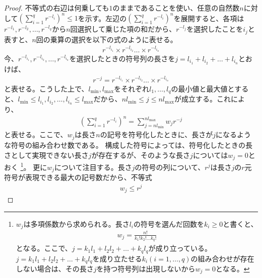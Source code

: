 \documentclass[uplatex,dvipdfmx,b5j,10pt]{jsbook}
\theoremstyle{definition}
\begin{document}
\begin{proof}
  不等式の右辺は何乗しても$1$のままであることを使い、任意の自然数$n$に対して$(\sum_{i=1}^{q} r^{-l_{i}})^{n} \leq 1$を示す。左辺の$(\sum_{i=1}^{q} r^{-l_{i}})^{n}$を展開すると、各項は$r^{-l_{1}}, r^{-l_{2}}, \dots, r^{-l_{q}}$から$n$回選択して乗じた項の和だから、$r^{-l_{j}}$を選択したことを$i_{j}$と表すと、$n$回の乗算の選択を以下の式のように表せる。
  \begin{eqnarray*}
    r^{-l_{i_{1}}} \times r^{-l_{i_{2}}} \dots \times r^{-l_{i_{n}}} 
  \end{eqnarray*}
  今、$r^{-l_{i_{1}}}, r^{-l_{i_{2}}}, \dots, r^{-l_{i_{n}}}$を選択したときの符号列の長さを$j = l_{i_{1}} + l_{i_{2}} + \dots + l_{i_{n}}$とおけば、
  \begin{eqnarray*}
    r^{-j} = r^{-l_{i_{1}}} \times r^{-l_{i_{2}}} \dots \times r^{-l_{i_{n}}} 
  \end{eqnarray*}
  と表せる。こうした上で、$l_{\min}, l_{\max}$をそれぞれ$l_{1}, \dots, l_{q}$の最小値と最大値とすると、$l_{\min} \leq l_{i_{1}}, l_{i_{2}}, \dots, l_{i_{n}} \leq l_{\max}$だから、$nl_{\min} \leq j \leq nl_{\max}$が成立する。これにより、
  \begin{eqnarray} \label{n_times_mult_mcmillan}
    \left( \sum_{i=1}^{q} r^{-l_{i}} \right)^{n} = \sum_{j = nl_{\min}}^{nl_{\max}} w_{j} r^{-j}
  \end{eqnarray}
  と表せる。ここで、$w_{j}$は長さ$n$の記号を符号化したときに、長さが$j$になるような符号の組み合わせ数である。
  構成した符号によっては、符号化したときの長さとして実現できない長さ$j$が存在するが、そのような長さ$j$については$w_{j} = 0$とおく
  \footnote{$w_{j}$は多項係数から求められる。長さ$l_{i}$の符号を選んだ回数を$k_{i} \geq 0$と書くと、
  \begin{eqnarray*} 
    w_{j} = \frac{n!}{k_{1}!k_{2}!\dots k_{q}!}
  \end{eqnarray*} 
  となる。ここで、$j = k_{1}l_{1} + l_{2}l_{2} + \dots + k_{q}l_{q}$が成り立っている。$j = k_{1}l_{1} + l_{2}l_{2} + \dots + k_{q}l_{q}$を成り立たせる$k_{i} (i = 1,\dots,q)$の組み合わせが存在しない場合は、その長さ$j$を持つ符号列は出現しないから$w_{j} = 0$となる。}。
  更に$w_{j}$について注目する。長さ$j$の符号の列について、$r^{j}$は長さ$j$の$r$元符号が表現できる最大の記号数だから、不等式
  \begin{eqnarray} \label{ineq_of_combination_of_codes}
    w_{j} \leq r^{j}
  \end{eqnarray} 

\end{proof}
\end{document}
